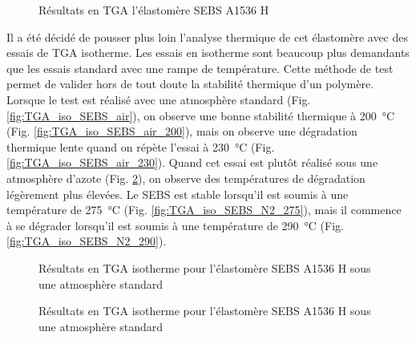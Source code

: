\begin{figure}[h]
	\centering
	\qquad
	\caption{Résultats en TGA l'élastomère SEBS A1536 H}
	\label{fig:TGA_rampe_SEBS}
\end{figure}

Il a été décidé de pousser plus loin l'analyse thermique de cet élastomère avec des essais de TGA isotherme. 
Les essais en isotherme sont beaucoup plus demandants que les essais standard avec une rampe de température. 
Cette méthode de test permet de valider hors de tout doute la stabilité thermique d'un polymère. 
Lorsque le test est réalisé avec une atmosphère standard (Fig. \ref{fig:TGA_iso_SEBS_air}), on observe une bonne stabilité thermique à \SI{200}{\celsius} (Fig. \ref{fig:TGA_iso_SEBS_air_200}), mais on observe une dégradation thermique lente quand on répète l'essai à \SI{230}{\celsius} (Fig. \ref{fig:TGA_iso_SEBS_air_230}). 
Quand cet essai est plutôt réalisé sous une atmosphère d'azote (Fig. \ref{fig:TGA_iso_SEBS_N2}), on observe des températures de dégradation légèrement plus élevées. 
Le SEBS est stable lorsqu'il est soumis à une température de \SI{275}{\celsius} (Fig. \ref{fig:TGA_iso_SEBS_N2_275}), mais il commence à se dégrader lorsqu'il est soumis à une température de \SI{290}{\celsius} (Fig. \ref{fig:TGA_iso_SEBS_N2_290}). 

\begin{figure}[h]
	\centering
	\qquad
	\caption{Résultats en TGA isotherme pour l'élastomère SEBS A1536 H sous une atmosphère standard}
	\label{fig:TGA_iso_SEBS_air}
	\centering
	\qquad
	\caption{Résultats en TGA isotherme pour l'élastomère SEBS A1536 H sous une atmosphère standard}
	\label{fig:TGA_iso_SEBS_N2}
\end{figure}

